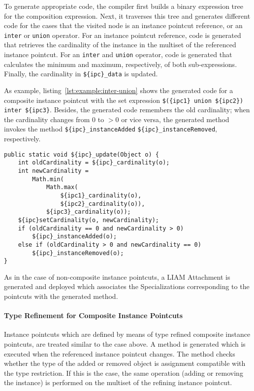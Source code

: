 To generate appropriate code, the compiler first builds a binary expression tree for the composition expression.
Next, it traverses this tree and generates different code for the cases that the visited node is an instance pointcut reference, or an \texttt{inter} or \texttt{union} operator.
For an instance pointcut reference, code is generated that retrieves the cardinality of the instance in the multiset of the referenced instance pointcut.
For an \texttt{inter} and \texttt{union} operator, code is generated that calculates the minimum and maximum, respectively, of both sub-expressions. Finally, the cardinality in \lstinline!${ipc}_data! is updated. 

As example, listing~\ref{lst:example:inter-union} shows the generated code for a composite instance pointcut with the set expression \lstinline!$({ipc1} union ${ipc2}) inter ${ipc3}!. Besides, the generated code remembers the old cardinality; when the cardinality changes from $0$ to $>0$ or vice versa, the generated method invokes the method \lstinline!${ipc}_instanceAdded! \lstinline!${ipc}_instanceRemoved!, respectively. 

\begin{lstlisting}[float,caption={The update method generated from a composition expression},label=lst:example:inter-union]
public static void ${ipc}_update(Object o) {
	int oldCardinality = ${ipc}_cardinality(o);
	int newCardinality =
		Math.min(
			Math.max(
				${ipc1}_cardinality(o),
				${ipc2}_cardinality(o)),
			${ipc3}_cardinality(o));
	${ipc}setCardinality(o, newCardinality);
	if (oldCardinality == 0 and newCardinality > 0)
		${ipc}_instanceAdded(o);
	else if (oldCardinality > 0 and newCardinality == 0)
		${ipc}_instanceRemoved(o);
}
\end{lstlisting}

As in the case of non-composite instance pointcuts, a LIAM Attachment is generated and deployed which associates the Specializations corresponding to the pointcuts with the generated method.

\paragraph{Type Refinement for Composite Instance Pointcuts}

Instance pointcuts which are defined by means of type refined composite instance pointcuts, are treated similar to the case above.
A method is generated which is executed when the referenced instance pointcut changes.
The method checks whether the type of the added or removed object is assignment compatible with the type restriction.
If this is the case, the same operation (adding or removing the instance) is performed on the multiset of the refining instance pointcut.

